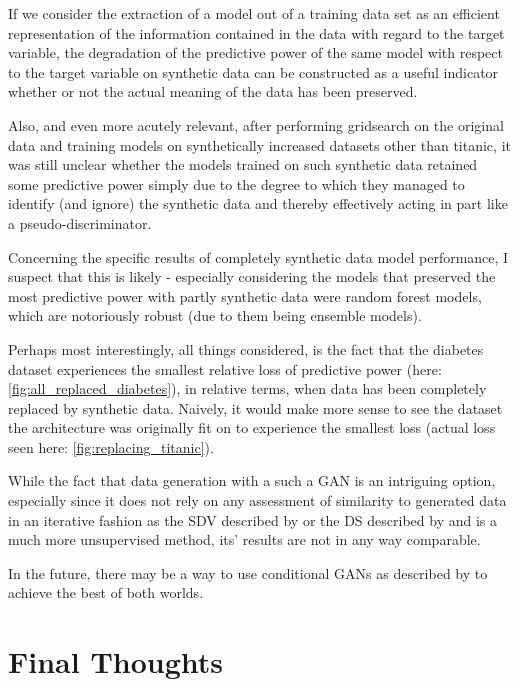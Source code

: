 If we consider the extraction of a model out of a training data set as an efficient representation of the information contained in the data with regard to the target variable, the degradation of the predictive power of the same model with respect to the target variable on synthetic data can be constructed as a useful indicator whether or not the actual meaning of the data has been preserved.

Also, and even more acutely relevant, after performing gridsearch on the original data and training models on synthetically increased datasets other than titanic, it was still unclear whether the models trained on such synthetic data retained some predictive power simply due to the degree to which they managed to identify (and ignore) the synthetic data and thereby effectively acting in part like a pseudo-discriminator.

Concerning the specific results of completely synthetic data model performance, I suspect that this is likely - especially considering the models that preserved the most predictive power with partly synthetic data were random forest models, which are notoriously robust (due to them being ensemble models).

\pagebreak

Perhaps most interestingly, all things considered, is the fact that the diabetes dataset experiences the smallest relative loss of predictive power (here: \ref{fig:all_replaced_diabetes}), in relative terms, when data has been completely replaced by synthetic data. Naively, it would make more sense to see the dataset the architecture was originally fit on to experience the smallest loss (actual loss seen here: \ref{fig:replacing_titanic}).

While the fact that data generation with a such a \ac{GAN} is an intriguing option, especially since it does not rely on any assessment of similarity to generated data in an iterative fashion as the \ac{SDV} described by \cite{patki2016synthetic} or the \ac{DS} described by \cite{ping2017datasynthesizer} and is a much more unsupervised method, its' results are not in any way comparable. 

In the future, there may be a way to use conditional \acp{GAN} as described by \cite{conditional_gans} to achieve the best of both worlds.

\pagebreak

\section{Final Thoughts}

